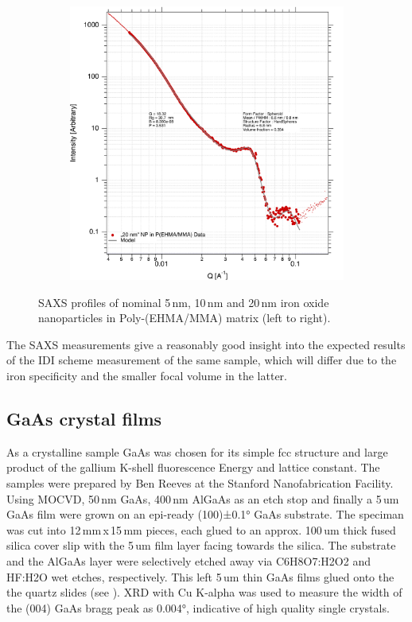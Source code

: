 \begin{figure}[tp]
\begin{subfigure}[b]{0.3\textwidth}
	\end{subfigure}
	\begin{subfigure}[b]{0.3\textwidth}
		\includegraphics[width=\linewidth]{images/pmma20.pdf}
	\end{subfigure}
	
	\caption[SAXS profile of iron oxide nanoparticles in  Poly-(EHMA/MMA) matrix]{SAXS profiles of nominal 5\,nm, 10\,nm and 20\,nm iron oxide nanoparticles in Poly-(EHMA/MMA) matrix (left to right).}
	\label{fig:saxspmma}
\end{figure}

The SAXS measurements give a reasonably good insight into the expected results of the IDI scheme measurement of the same sample, which will differ due to the iron specificity and the smaller focal volume in the latter.  

\subsection{GaAs crystal films}
As a crystalline sample GaAs was chosen for its simple fcc structure and large product of the gallium K-shell fluorescence Energy and lattice constant. The samples were prepared by Ben Reeves at the Stanford Nanofabrication Facility. 
Using MOCVD, 50\,nm GaAs, 400\,nm AlGaAs as an etch stop and finally a 5\,um GaAs film were grown on an epi-ready (100)±0.1° GaAs substrate. The speciman was cut into 12\,mm\,x\,15\,mm pieces, each glued to an approx. 100\,um thick fused silica cover slip with the 5\,um film layer facing towards the silica. The substrate and the AlGaAs layer were selectively etched away via C6H8O7:H2O2 and HF:H2O wet etches, respectively. This left 5\,um thin GaAs films glued onto the the quartz slides (see ).  XRD with Cu K-alpha was used to measure the width of the (004) GaAs bragg peak as 0.004°, indicative of high quality single crystals. 

